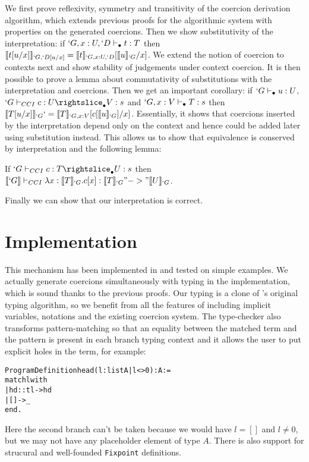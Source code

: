 \documentclass{llncs}
\newenvironment{code}{\begin{alltt}\vspace{-1.4em}}{\vspace{-1.4em}\end{alltt}}
\begin{document}
We first prove reflexivity, symmetry and transitivity of the coercion
derivation algorithm, which extends previous proofs for the algorithmic
system with properties on
the generated coercions. Then we show substitutivity of the
interpretation: if $`G, x : U, `D \vdash_{\bullet} t : T$ then $\llbracket t[u/x] \rrbracket_{`G,
 `D[u/x]} = \llbracket t \rrbracket_{`G, x : U, `D}[\llbracket u \rrbracket_{`G}/x]$. We extend the notion
of coercion to contexts next and show stability of judgements under
context coercion. It is then possible to prove a lemma about commutativity of
substitutions with the interpretation and coercions. Then we get an
important corollary: if $`G \vdash_{\bullet} u : U$, $\subimpl{`G}{c}{U}{V}{s}$ and
$`G, x : V \vdash_{\bullet} T : s$ then $\llbracket T[u/x] \rrbracket_{`G} `= \llbracket T \rrbracket_{`G, x :
  V}[c[\llbracket u \rrbracket_{`G}]/x]$. Essentially, it shows that coercions inserted
by the interpretation depend only on the context and hence could be
added later using substitution instead. This allows us to show that
equivalence is conserved by interpretation and the following lemma:
\begin{lemma}
  \label{lemma:coercion-correct}
  If $\subimpl{`G}{c}{T}{U}{s}$ then $\llbracket `G \rrbracket \vdash_{CCI} \lambda x :
  \llbracket T \rrbracket_{`G}.c[x] : \llbracket T \rrbracket_{`G} "->" \llbracket U \rrbracket_{`G}$.
\end{lemma}
 Finally we can show that our interpretation is correct.

\section{Implementation}
\label{sec:Program}
This mechanism has been implemented in \Coq and tested on simple
examples. We actually generate coercions simultaneously with typing 
in the implementation, which is sound thanks to the previous proofs. Our
typing is a clone of \Coq's original typing algorithm, so we benefit
from all the features of \Coq including implicit variables, notations and the existing
coercion system. The type-checker also transforms pattern-matching so
that an equality between the matched term and the pattern is present in
each branch typing context and it allows the user to put explicit holes in the term, for example:
\begin{code}
  Program Definition head ( l : list A | l <> 0 ) : A :=
    match l with
    | hd :: tl -> hd
    | [] -> _
    end.
\end{code}
Here the second branch can't be taken because we would have $l = []$ and
$l \neq 0$, but we may not have any placeholder element of type
$A$. There is also support for strucural and well-founded \verb|Fixpoint| definitions.
\end{document}
